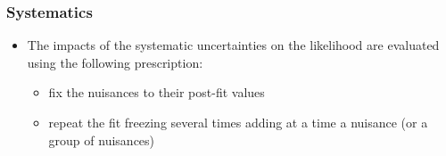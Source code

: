 \documentclass{beamer}
\begin{document}
\begin{frame}
\frametitle{Systematics}
\begin{center}
\end{center}
\vspace{-0.5cm}
\begin{itemize}
\scriptsize
\item The impacts of the systematic uncertainties on the likelihood are evaluated using the following prescription:
\begin{itemize}
\scriptsize
\item fix the nuisances to their post-fit values
\item repeat the fit freezing several times adding at a time a nuisance (or a group of nuisances)
\end{itemize}
\end{itemize}
\end{frame}
\end{document}
